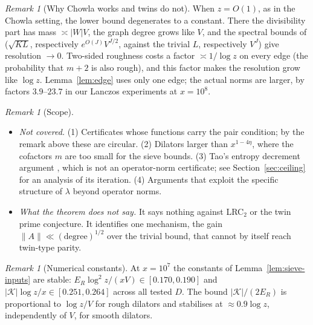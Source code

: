 \documentclass[11pt]{amsart}
\theoremstyle{definition}
\theoremstyle{remark}
\newtheorem{remark}[theorem]{Remark}
\begin{document}
\begin{remark}[Why Chowla works and twins do not]
When $z=O(1)$, as in the Chowla setting, the lower bound degenerates to a constant. There the divisibility part has mass $\asymp|W|V$, the graph degree grows like $V$, and the spectral bounds of \cite{HR21,Pil23} ($\sqrt{KL}$, respectively $e^{O(J)}V^{J/2}$, against the trivial $L$, respectively $V^J$) give resolution $\to0$. Two-sided roughness costs a factor $\asymp1/\log z$ on every edge (the probability that $m+2$ is also rough), and this factor makes the resolution grow like $\log z$. Lemma~\ref{lem:edge} uses only one edge; the actual norms are larger, by factors $3.9$--$23.7$ in our Lanczos experiments at $x=10^8$.
\end{remark}

\begin{remark}[Scope]
\leavevmode
\begin{itemize}
\item \emph{Not covered.} (1) Certificates whose functions carry the pair condition; by the remark above these are circular. (2) Dilators larger than $x^{1-4\eta}$, where the cofactors $m$ are too small for the sieve bounds. (3) Tao's entropy decrement argument \cite{Tao16}, which is not an operator-norm certificate; see Section~\ref{sec:ceiling} for an analysis of its iteration. (4) Arguments that exploit the specific structure of $\lambda$ beyond operator norms.
\item \emph{What the theorem does not say.} It says nothing against LRC$_2$ or the twin prime conjecture. It identifies one mechanism, the gain $\|A\|\ll(\text{degree})^{1/2}$ over the trivial bound, that cannot by itself reach twin-type parity.
\end{itemize}
\end{remark}

\begin{remark}[Numerical constants]
At $x=10^7$ the constants of Lemma~\ref{lem:sieve-inputs} are stable: $E_R\log^2z/(xV)\in[0.170,0.190]$ and $|\mathcal K|\log z/x\in[0.251,0.264]$ across all tested $D$. The bound $|\mathcal K|/(2E_R)$ is proportional to $\log z/V$ for rough dilators and stabilises at $\approx0.9\log z$, independently of $V$, for smooth dilators.
\end{remark}
\end{document}
